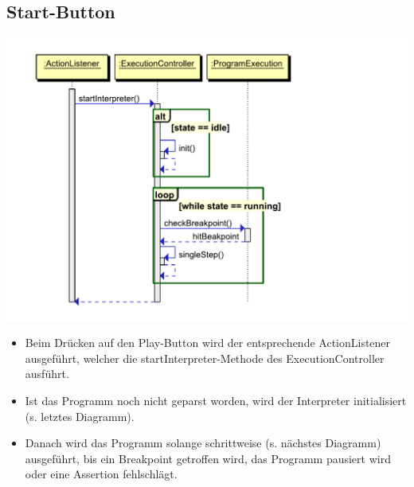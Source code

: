 \documentclass[10pt,a4paper,titlepage]{article}
\begin{document}
\subsection{Start-Button}
\includegraphics[scale=0.9]{images/Button_play.pdf} \newline
\begin{itemize}
\item Beim Drücken auf den Play-Button wird der entsprechende ActionListener ausgeführt, welcher die startInterpreter-Methode des ExecutionController ausführt.
\item Ist das Programm noch nicht geparst worden, wird der Interpreter initialisiert (s. letztes Diagramm).
\item Danach wird das Programm solange schrittweise (s. nächstes Diagramm) ausgeführt, bis ein Breakpoint getroffen wird, das Programm pausiert wird oder eine Assertion fehlschlägt.
\end{itemize}
\end{document}
